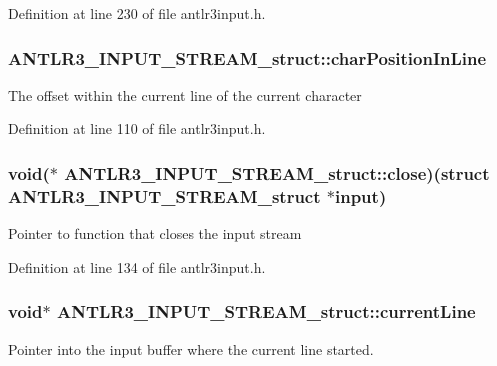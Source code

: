 Definition at line 230 of file antlr3input.\-h.

\hypertarget{struct_a_n_t_l_r3___i_n_p_u_t___s_t_r_e_a_m__struct_abe574b44337acb6550f27de7d80b8a08}{
\subsubsection[{char\-Position\-In\-Line}]{ A\-N\-T\-L\-R3\-\_\-\-I\-N\-P\-U\-T\-\_\-\-S\-T\-R\-E\-A\-M\-\_\-struct\-::char\-Position\-In\-Line}}\label{struct_a_n_t_l_r3___i_n_p_u_t___s_t_r_e_a_m__struct_abe574b44337acb6550f27de7d80b8a08}
The offset within the current line of the current character 

Definition at line 110 of file antlr3input.\-h.

\hypertarget{struct_a_n_t_l_r3___i_n_p_u_t___s_t_r_e_a_m__struct_a1174c85bc9399c19072476c3187eec25}{
\subsubsection[{close}]{\setlength{\rightskip}{0pt plus 5cm}void($\ast$ A\-N\-T\-L\-R3\-\_\-\-I\-N\-P\-U\-T\-\_\-\-S\-T\-R\-E\-A\-M\-\_\-struct\-::close)(struct {\bf A\-N\-T\-L\-R3\-\_\-\-I\-N\-P\-U\-T\-\_\-\-S\-T\-R\-E\-A\-M\-\_\-struct} $\ast$input)}}\label{struct_a_n_t_l_r3___i_n_p_u_t___s_t_r_e_a_m__struct_a1174c85bc9399c19072476c3187eec25}
Pointer to function that closes the input stream 

Definition at line 134 of file antlr3input.\-h.

\hypertarget{struct_a_n_t_l_r3___i_n_p_u_t___s_t_r_e_a_m__struct_a4c75e460ade15e43bd4628fac2430ac1}{
\subsubsection[{current\-Line}]{\setlength{\rightskip}{0pt plus 5cm}void$\ast$ A\-N\-T\-L\-R3\-\_\-\-I\-N\-P\-U\-T\-\_\-\-S\-T\-R\-E\-A\-M\-\_\-struct\-::current\-Line}}\label{struct_a_n_t_l_r3___i_n_p_u_t___s_t_r_e_a_m__struct_a4c75e460ade15e43bd4628fac2430ac1}
Pointer into the input buffer where the current line started. 

